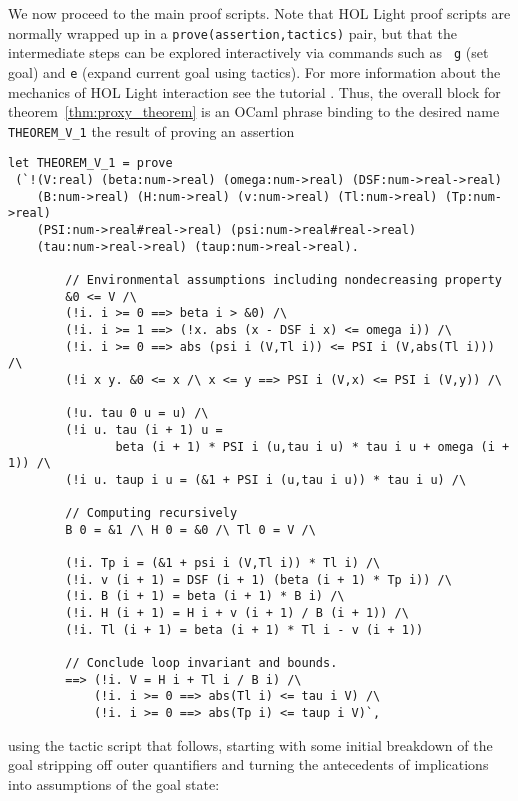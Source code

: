 \documentclass[10pt]{article}
\theoremstyle{definition}
\theoremstyle{remark}
\numberwithin{equation}{section}
\begin{document}
We now proceed to the main proof scripts. Note that HOL Light proof scripts
are normally wrapped up in a {\verb|prove(assertion,tactics)|} pair, but that
the intermediate steps can be explored interactively via commands such as {\tt
g} (set goal) and {\tt e} (expand current goal using tactics). For more
information about the mechanics of HOL Light interaction see the tutorial
\cite{harrison-tutorial}. Thus, the overall block for theorem~\ref{thm:proxy_theorem} is an OCaml
phrase binding to the desired name {\verb|THEOREM_V_1|} the result of proving
an assertion

\begin{scriptsize}\begin{verbatim}
let THEOREM_V_1 = prove
 (`!(V:real) (beta:num->real) (omega:num->real) (DSF:num->real->real)
    (B:num->real) (H:num->real) (v:num->real) (Tl:num->real) (Tp:num->real)
    (PSI:num->real#real->real) (psi:num->real#real->real)
    (tau:num->real->real) (taup:num->real->real).

        // Environmental assumptions including nondecreasing property
        &0 <= V /\
        (!i. i >= 0 ==> beta i > &0) /\
        (!i. i >= 1 ==> (!x. abs (x - DSF i x) <= omega i)) /\
        (!i. i >= 0 ==> abs (psi i (V,Tl i)) <= PSI i (V,abs(Tl i))) /\
        (!i x y. &0 <= x /\ x <= y ==> PSI i (V,x) <= PSI i (V,y)) /\

        (!u. tau 0 u = u) /\
        (!i u. tau (i + 1) u =
               beta (i + 1) * PSI i (u,tau i u) * tau i u + omega (i + 1)) /\
        (!i u. taup i u = (&1 + PSI i (u,tau i u)) * tau i u) /\

        // Computing recursively
        B 0 = &1 /\ H 0 = &0 /\ Tl 0 = V /\

        (!i. Tp i = (&1 + psi i (V,Tl i)) * Tl i) /\
        (!i. v (i + 1) = DSF (i + 1) (beta (i + 1) * Tp i)) /\
        (!i. B (i + 1) = beta (i + 1) * B i) /\
        (!i. H (i + 1) = H i + v (i + 1) / B (i + 1)) /\
        (!i. Tl (i + 1) = beta (i + 1) * Tl i - v (i + 1))

        // Conclude loop invariant and bounds.
        ==> (!i. V = H i + Tl i / B i) /\
            (!i. i >= 0 ==> abs(Tl i) <= tau i V) /\
            (!i. i >= 0 ==> abs(Tp i) <= taup i V)`,
\end{verbatim}\end{scriptsize}

\noindent using the tactic script that follows, starting with some initial
breakdown of the goal stripping off outer quantifiers and turning the
antecedents of implications into assumptions of the goal state:
\end{document}
